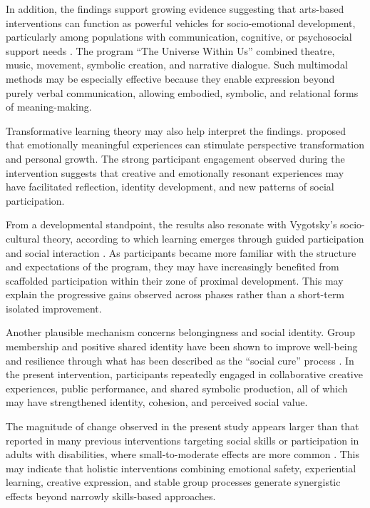 \documentclass[12pt,a4paper]{article}
\begin{document}
In addition, the findings support growing evidence suggesting that arts-based interventions can function as powerful vehicles for socio-emotional development, particularly among populations with communication, cognitive, or psychosocial support needs \citep{stickley2018,leavy2015}. The program ``The Universe Within Us'' combined theatre, music, movement, symbolic creation, and narrative dialogue. Such multimodal methods may be especially effective because they enable expression beyond purely verbal communication, allowing embodied, symbolic, and relational forms of meaning-making.

Transformative learning theory may also help interpret the findings. \citet{mezirow2000} proposed that emotionally meaningful experiences can stimulate perspective transformation and personal growth. The strong participant engagement observed during the intervention suggests that creative and emotionally resonant experiences may have facilitated reflection, identity development, and new patterns of social participation.

From a developmental standpoint, the results also resonate with Vygotsky's socio-cultural theory, according to which learning emerges through guided participation and social interaction \citep{vygotsky1978}. As participants became more familiar with the structure and expectations of the program, they may have increasingly benefited from scaffolded participation within their zone of proximal development. This may explain the progressive gains observed across phases rather than a short-term isolated improvement.

Another plausible mechanism concerns belongingness and social identity. Group membership and positive shared identity have been shown to improve well-being and resilience through what has been described as the ``social cure'' process \citep{haslam2018}. In the present intervention, participants repeatedly engaged in collaborative creative experiences, public performance, and shared symbolic production, all of which may have strengthened identity, cohesion, and perceived social value.

The magnitude of change observed in the present study appears larger than that reported in many previous interventions targeting social skills or participation in adults with disabilities, where small-to-moderate effects are more common \citep{hall2009,verdonschot2009}. This may indicate that holistic interventions combining emotional safety, experiential learning, creative expression, and stable group processes generate synergistic effects beyond narrowly skills-based approaches.
\end{document}
